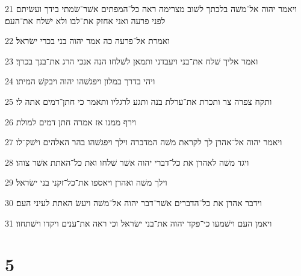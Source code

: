 \par 21 ויאמר יהוה אל־משׁה בלכתך לשׁוב מצרימה ראה כל־המפתים אשׁר־שׂמתי בידך ועשׂיתם לפני פרעה ואני אחזק את־לבו ולא ישׁלח את־העם׃
\par 22 ואמרת אל־פרעה כה אמר יהוה בני בכרי ישׂראל׃
\par 23 ואמר אליך שׁלח את־בני ויעבדני ותמאן לשׁלחו הנה אנכי הרג את־בנך בכרך׃
\par 24 ויהי בדרך במלון ויפגשׁהו יהוה ויבקשׁ המיתו׃
\par 25 ותקח צפרה צר ותכרת את־ערלת בנה ותגע לרגליו ותאמר כי חתן־דמים אתה לי׃
\par 26 וירף ממנו אז אמרה חתן דמים למולת׃
\par 27 ויאמר יהוה אל־אהרן לך לקראת משׁה המדברה וילך ויפגשׁהו בהר האלהים וישׁק־לו׃
\par 28 ויגד משׁה לאהרן את כל־דברי יהוה אשׁר שׁלחו ואת כל־האתת אשׁר צוהו׃
\par 29 וילך משׁה ואהרן ויאספו את־כל־זקני בני ישׂראל׃
\par 30 וידבר אהרן את כל־הדברים אשׁר־דבר יהוה אל־משׁה ויעשׂ האתת לעיני העם׃
\par 31 ויאמן העם וישׁמעו כי־פקד יהוה את־בני ישׂראל וכי ראה את־ענים ויקדו וישׁתחוו׃

\chapter{5}

